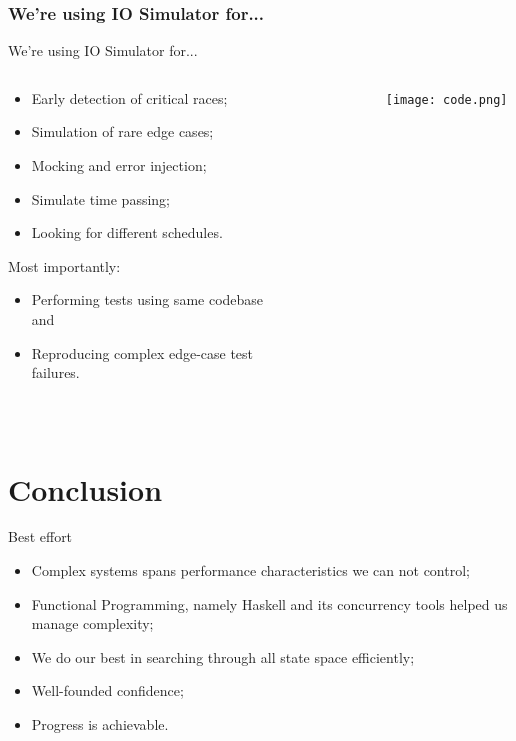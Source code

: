 \documentclass{beamer}
\begin{document}
\subsubsection*{We're using IO Simulator for...}
\begin{frame}{We're using IO Simulator for...}
  \begin{columns}
    \begin{column}{0.4\textwidth}
      \begin{itemize}
        \item Early detection of critical races;
        \item Simulation of rare \alert{edge cases};
        \item Mocking and \alert{error injection};
        \item Simulate time passing;
        \item Looking for \alert{different schedules}.
      \end{itemize}
      Most importantly:
      \begin{itemize}
        \item Performing tests using \alert{same codebase} and
        \item \alert{Reproducing} complex edge-case test failures.
      \end{itemize}
    
    \end{column}
    \begin{column}{0.6\textwidth}
      \texttt{[image: code.png]}
    \end{column}
  \end{columns}
\end{frame}

\section{Conclusion}

\begin{frame}{Best effort}
  \begin{itemize}
    \item Complex systems spans performance characteristics we can not control;
    \item Functional Programming, namely Haskell and its concurrency tools helped us manage complexity;
    \item We do our best in searching through all state space efficiently;
    \item Well-founded confidence;
    \item Progress is achievable.
  \end{itemize}
\end{frame}
\end{document}
